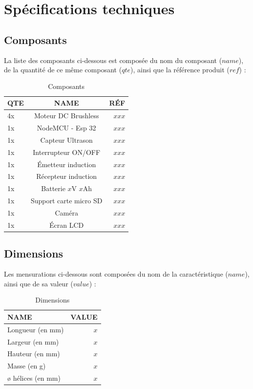 \documentclass{rapport}
\begin{document}
\section{Spécifications techniques}
\subsection{Composants}
La liste des composants ci-dessous est composée du nom du composant ($name$), de la quantité de ce même composant ($qte$), ainsi que la référence produit ($ref$) : 
\begin{table}[htb]
    \centering
    \begin{tabular}{|l|c|r|}
        \hline
        \textbf{QTE} & \textbf{NAME} & \textbf{RÉF} \\
        \hline
        4x & Moteur DC Brushless & $xxx$ \\
        \hline
        1x & NodeMCU - Esp 32 & $xxx$ \\
        \hline
        1x & Capteur Ultrason & $xxx$ \\
        \hline
        1x & Interrupteur ON/OFF & $xxx$ \\
        \hline
        1x & Émetteur induction & $xxx$ \\
        \hline
        1x & Récepteur induction & $xxx$ \\
        \hline
        1x & Batterie $x$V $x$Ah & $xxx$ \\
        \hline
        1x & Support carte micro SD & $xxx$ \\
        \hline
        1x & Caméra & $xxx$ \\
        \hline
        1x & Écran LCD & $xxx$ \\
        \hline
    \end{tabular}
    \caption{Composants}
    \label{tab:my_label}
\end{table}

\subsection{Dimensions}
Les mensurations ci-dessous sont composées du nom de la caractéristique ($name$), ainsi que de sa valeur ($value$) :
\begin{table}[htb]
    \centering
    \begin{tabular}{|l|r|}
        \hline
        \textbf{NAME} & \textbf{VALUE} \\
        \hline
        Longueur (en mm) & $x$ \\
        \hline
        Largeur (en mm) & $x$ \\
        \hline
        Hauteur (en mm) & $x$ \\
        \hline
        Masse (en g) & $x$ \\
        \hline
        ø hélices (en mm) & $x$ \\
        \hline
    \end{tabular}
    \caption{Dimensions}
    \label{tab:my_label}
\end{table}
\end{document}
